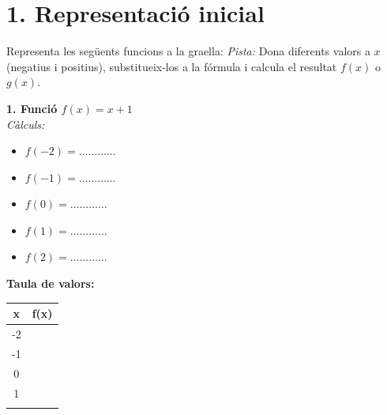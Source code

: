 \documentclass[12pt,a4paper]{article}
\begin{document}
\section*{1. Representació inicial}
Representa les següents funcions a la graella:
\textit{Pista:} Dona diferents valors a $x$ (negatius i positius), substitueix-los a la fórmula i calcula el resultat $f(x)$ o $g(x)$.

\vspace{0.5cm}

\noindent
\begin{minipage}[t]{0.48\textwidth}
    \textbf{1. Funció $f(x) = x + 1$} \\
    
    \textit{Càlculs:}
    \begin{itemize}
        \item $f(-2) = \dots\dots\dots\dots$
        \item $f(-1) = \dots\dots\dots\dots$
        \item $f(0) = \dots\dots\dots\dots$
        \item $f(1) = \dots\dots\dots\dots$
        \item $f(2) = \dots\dots\dots\dots$
    \end{itemize}

    \vspace{0.2cm}
    \centering
    \textbf{Taula de valors:} \\
    \renewcommand{\arraystretch}{1.5}
    \begin{tabular}{|c|c|}
        \hline
        \textbf{x} & \textbf{f(x)} \\ \hline
        -2 & \\ \hline
        -1 & \\ \hline
        0 & \\ \hline
        1 & \\ \hline
         & \\ \hline
    \end{tabular}
\end{minipage}
\hfill
\end{document}
